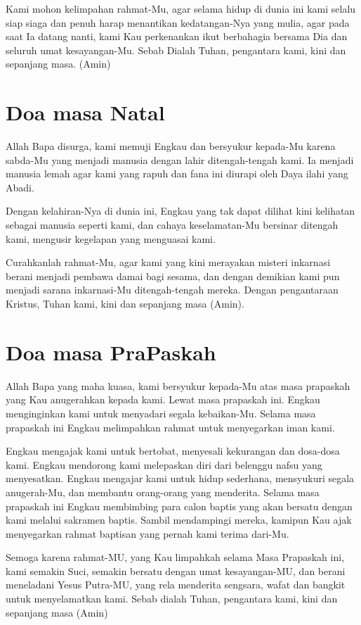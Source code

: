 \documentclass{article}
\begin{document}
Kami mohon kelimpahan rahmat-Mu, agar selama hidup di dunia ini kami
selalu siap siaga dan penuh harap menantikan kedatangan-Nya yang mulia,
agar pada saat Ia datang nanti, kami Kau perkenankan ikut berbahagia
bersama Dia dan seluruh umat kesayangan-Mu. Sebab Dialah Tuhan,
pengantara kami, kini dan sepanjang masa. (Amin)

\section[Doa masa Natal]{Doa masa Natal}
Allah Bapa disurga, kami memuji Engkau dan bersyukur kepada-Mu karena
sabda-Mu yang menjadi manusia dengan lahir ditengah-tengah kami. Ia
menjadi manusia lemah agar kami yang rapuh dan fana ini diurapi oleh
Daya ilahi yang Abadi.

Dengan kelahiran-Nya di dunia ini, Engkau yang tak dapat dilihat kini
kelihatan sebagai manusia seperti kami, dan cahaya keselamatan-Mu
bersinar ditengah kami, mengusir kegelapan yang menguasai kami.

Curahkanlah rahmat-Mu, agar kami yang kini merayakan misteri inkarnasi
berani menjadi pembawa damai bagi sesama, dan dengan demikian kami pun
menjadi sarana inkarnasi-Mu ditengah-tengah mereka. Dengan pengantaraan
Kristus, Tuhan kami, kini dan sepanjang masa (Amin).

\section[Doa masa PraPaskah]{Doa masa PraPaskah}
Allah Bapa yang maha kuasa, kami bersyukur kepada-Mu atas masa prapaskah
yang Kau anugerahkan kepada kami. Lewat masa prapaskah ini. Engkau
menginginkan kami untuk menyadari segala kebaikan-Mu. Selama masa
prapaskah ini Engkau melimpahkan rahmat untuk menyegarkan iman kami.

Engkau mengajak kami untuk bertobat, menyesali kekurangan dan dosa-dosa
kami. Engkau mendorong kami melepaskan diri dari belenggu nafsu yang
menyesatkan. Engkau mengajar kami untuk hidup sederhana, mensyukuri
segala anugerah-Mu, dan membantu orang-orang yang menderita. Selama
masa prapaskah ini Engkau membimbing para calon baptis yang akan
bersatu dengan kami melalui sakramen baptis. Sambil mendampingi mereka,
kamipun Kau ajak menyegarkan rahmat baptisan yang pernah kami terima
dari-Mu.

Semoga karena rahmat-MU, yang Kau limpahkah selama Masa Prapaskah ini,
kami semakin Suci, semakin bersatu dengan umat kesayangan-MU, dan
berani meneladani Yesus Putra-MU, yang rela menderita sengsara, wafat
dan bangkit untuk menyelamatkan kami. Sebab dialah Tuhan, pengantara
kami, kini dan sepanjang masa (Amin)
\end{document}

